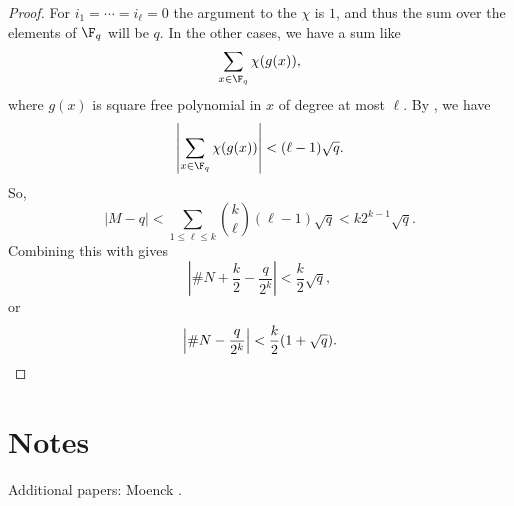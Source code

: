 \begin{proof}
For $i_1 = \cdots = i_\ell = 0$ the argument to the $\chi$ is $1$, and
thus the sum over the elements of $\F_q$ will be $q$.  In the other
cases, we have a sum like
\[
\sum_{x \in \F_q} \chi(g(x)),
\]
where $g(x)$ is square free polynomial in $x$ of degree at most
$\ell$.  By , we have
\[
\left|\sum_{x \in \F_q} \chi(g(x))\right| < (\ell -1 ) \sqrt{q}.
\]
So,
\[
|M - q| < \sum_{1 \le \ell \le k} {k \choose \ell} (\ell -1) \sqrt{q} <
k 2^{k-1} \sqrt{q}.
\]
Combining this with  gives
\[
\left| \#N + \frac{k}{2} - \frac{q}{2^k}\right| < \frac{k}{2}\sqrt{q},
\]
or
\[
\left|\#N - {q \over 2^k}\right| < {k \over 2} (1 + \sqrt{q}).
\] 
\end{proof}


\section*{Notes}

Additional papers: Moenck \cite{Moenck77}.
